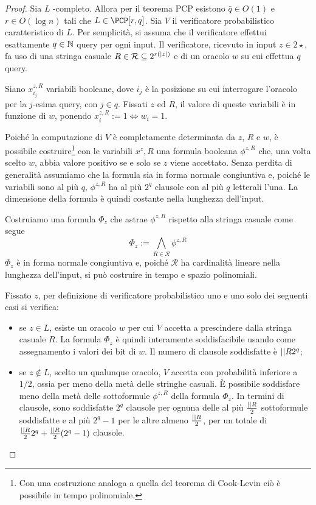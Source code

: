 \begin{proof}
	\newcommand{\Rand}{\mathcal R}
	Sia $L$ \NP-completo. Allora per il teorema PCP esistono $\bar q\in O(1)$ e $r\in O(\log n)$ tali che $L\in\PCP[r,q]$.
	Sia $V$ il verificatore probabilistico caratteristico di $L$.
	Per semplicità, si assuma che il verificatore effettui esattamente $q\in\mathbb N$ query per ogni input.
	Il verificatore, ricevuto in input $z\in 2\star$, fa uso di una stringa casuale $R\in\Rand\subseteq 2^{r(\len z)}$ e di un oracolo $w$ su cui effettua $q$ query.

	Siano $x^{z,R}_{i_j}$ variabili booleane, dove $i_j$ è la posizione su cui interrogare l'oracolo per la $j$-esima query, con $j\in q$.
	Fissati $z$ ed $R$, il valore di queste variabili è in funzione di $w$, ponendo $x^{z,R}_i:=1\iff w_i=1$.

	Poiché la computazione di $V$ è completamente determinata da $z$, $R$ e $w$, è possibile costruire\footnote{Con una costruzione analoga a quella del teorema di Cook-Levin ciò è possibile in tempo polinomiale.} con le variabili $x^z,R$ una formula booleana $\phi^{z,R}$ che, una volta scelto $w$, abbia valore positivo se e solo se $z$ viene accettato.
	Senza perdita di generalità assumiamo che la formula sia in forma normale congiuntiva e, poiché le variabili sono al più $q$, $\phi^{z,R}$ ha al più $2^q$ clausole con al più $q$ letterali l'una. La dimensione della formula è quindi costante nella lunghezza dell'input.

	Costruiamo una formula $\Phi_z$ che astrae $\phi^{z,R}$ rispetto alla stringa casuale come segue
	\begin{equation*}
		\Phi_z := \bigwedge_{R\in\Rand} \phi^{z,R}
	\end{equation*}
	$\Phi_z$ è in forma normale congiuntiva e, poiché $\Rand$ ha cardinalità lineare nella lunghezza dell'input, si può costruire in tempo e spazio polinomiali.

	Fissato $z$, per definizione di verificatore probabilistico uno e uno solo dei seguenti casi si verifica:
	\begin{itemize}
		\item se $z\in L$, esiste un oracolo $w$ per cui $V$ accetta a prescindere dalla stringa casuale $R$. La formula $\Phi_z$ è quindi interamente soddisfacibile usando come assegnamento i valori dei bit di $w$. Il numero di clausole soddisfatte è $\card\Rand 2^q$;
		\item se $z\notin L$, scelto un qualunque oracolo, $V$ accetta con probabilità inferiore a $1/2$, ossia per meno della metà delle stringhe casuali. È possibile soddisfare meno della metà delle sottoformule $\phi^{z,R}$ della formula $\Phi_z$. In termini di clausole, sono soddisfatte $2^q$ clausole per ognuna delle al più $\frac{\card\Rand}{2}$ sottoformule soddisfatte e al più $2^q-1$ per le altre almeno $\frac{\card\Rand}{2}$, per un totale di $\frac{\card\Rand}{2}2^q+\frac{\card\Rand}{2}(2^q-1)$ clausole.
	\end{itemize}


\end{proof}
